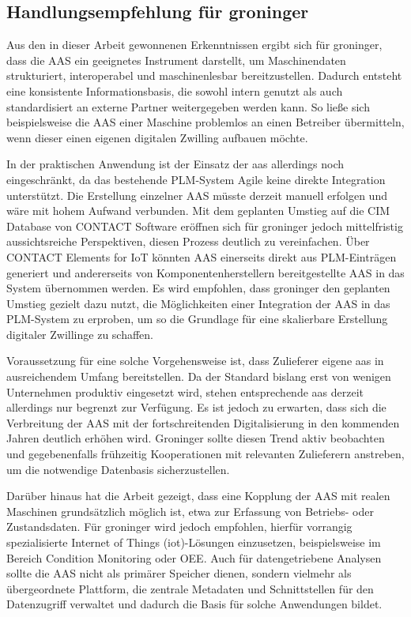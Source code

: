 \newpage
\subsection{Handlungsempfehlung für groninger}

Aus den in dieser Arbeit gewonnenen Erkenntnissen ergibt sich für groninger, dass die AAS ein geeignetes Instrument darstellt, um Maschinendaten strukturiert, interoperabel und maschinenlesbar bereitzustellen. 
Dadurch entsteht eine konsistente Informationsbasis, die sowohl intern genutzt als auch standardisiert an externe Partner weitergegeben werden kann. 
So ließe sich beispielsweise die AAS einer Maschine problemlos an einen Betreiber übermitteln, wenn dieser einen eigenen digitalen Zwilling aufbauen möchte.

In der praktischen Anwendung ist der Einsatz der \acs{aas} allerdings noch eingeschränkt, da das bestehende PLM-System Agile keine direkte Integration unterstützt. 
Die Erstellung einzelner AAS müsste derzeit manuell erfolgen und wäre mit hohem Aufwand verbunden.
Mit dem geplanten Umstieg auf die CIM Database von CONTACT Software eröffnen sich für groninger jedoch mittelfristig aussichtsreiche Perspektiven, diesen Prozess deutlich zu vereinfachen. 
Über CONTACT Elements for IoT könnten AAS einerseits direkt aus PLM-Einträgen generiert und andererseits von Komponentenherstellern bereitgestellte AAS in das System übernommen werden. 
Es wird empfohlen, dass groninger den geplanten Umstieg gezielt dazu nutzt, die Möglichkeiten einer Integration der AAS in das PLM-System zu erproben, um so die Grundlage für eine skalierbare Erstellung digitaler Zwillinge zu schaffen.

Voraussetzung für eine solche Vorgehensweise ist, dass Zulieferer eigene \acs{aas} in ausreichendem Umfang bereitstellen. 
Da der Standard bislang erst von wenigen Unternehmen produktiv eingesetzt wird, stehen entsprechende \acs{aas} derzeit allerdings nur begrenzt zur Verfügung. 
Es ist jedoch zu erwarten, dass sich die Verbreitung der AAS mit der fortschreitenden Digitalisierung in den kommenden Jahren deutlich erhöhen wird. 
Groninger sollte diesen Trend aktiv beobachten und gegebenenfalls frühzeitig Kooperationen mit relevanten Zulieferern anstreben, um die notwendige Datenbasis sicherzustellen.

Darüber hinaus hat die Arbeit gezeigt, dass eine Kopplung der AAS mit realen Maschinen grundsätzlich möglich ist, etwa zur Erfassung von Betriebs- oder Zustandsdaten. 
Für groninger wird jedoch empfohlen, hierfür vorrangig spezialisierte Internet of Things (\acs{iot})-Lösungen einzusetzen, beispielsweise im Bereich Condition Monitoring oder OEE.
Auch für datengetriebene Analysen sollte die AAS nicht als primärer Speicher dienen, sondern vielmehr als übergeordnete Plattform, die zentrale Metadaten und Schnittstellen für den Datenzugriff verwaltet und dadurch die Basis für solche Anwendungen bildet.


